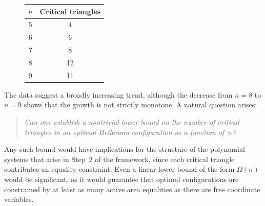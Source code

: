 \documentclass[11pt,a4paper]{article}
\theoremstyle{plain}
\theoremstyle{definition}
\theoremstyle{remark}
\begin{document}
\begin{figure}[h]
  \centering
  \begin{minipage}{0.35\linewidth}\centering
  \begin{tabular}{c c}
  \toprule
  $n$ & Critical triangles \\
  \midrule
  5 & 4 \\
  6 & 6 \\
  7 & 8 \\
  8 & 12 \\
  9 & 11 \\
  \bottomrule
  \end{tabular}
  \label{tab:critical-counts}
  \end{minipage}\hfill
  \begin{minipage}{0.55\linewidth}\centering
  \label{fig:critical-count-plot}
  \end{minipage}
\end{figure}

The data suggest a broadly increasing trend, although the decrease from $n=8$
to $n=9$ shows that the growth is not strictly monotone.  A natural question
arises:

\begin{quote}
\emph{Can one establish a nontrivial lower bound on the number of critical
triangles in an optimal Heilbronn configuration as a function of~$n$?}
\end{quote}

Any such bound would have implications for the structure of the polynomial
systems that arise in Step~2 of the framework, since each critical triangle
contributes an equality constraint.  Even a linear lower bound of the form
$\Omega(n)$ would be significant, as it would guarantee that optimal
configurations are constrained by at least as many active area equalities as
there are free coordinate variables.
\end{document}
